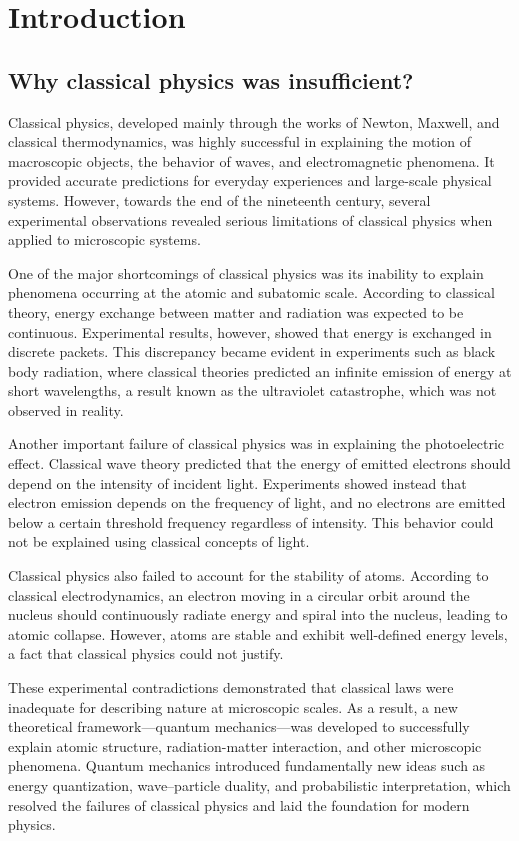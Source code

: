 \documentclass[17pt,a4paper]{extarticle}
\begin{document}
\section{Introduction}
\subsection{Why classical physics was insufficient?}

Classical physics, developed mainly through the works of Newton, Maxwell, and classical thermodynamics, was highly successful in explaining the motion of macroscopic objects, the behavior of waves, and electromagnetic phenomena. It provided accurate predictions for everyday experiences and large-scale physical systems. However, towards the end of the nineteenth century, several experimental observations revealed serious limitations of classical physics when applied to microscopic systems.

One of the major shortcomings of classical physics was its inability to explain phenomena occurring at the atomic and subatomic scale. According to classical theory, energy exchange between matter and radiation was expected to be continuous. Experimental results, however, showed that energy is exchanged in discrete packets. This discrepancy became evident in experiments such as black body radiation, where classical theories predicted an infinite emission of energy at short wavelengths, a result known as the ultraviolet catastrophe, which was not observed in reality.

Another important failure of classical physics was in explaining the photoelectric effect. Classical wave theory predicted that the energy of emitted electrons should depend on the intensity of incident light. Experiments showed instead that electron emission depends on the frequency of light, and no electrons are emitted below a certain threshold frequency regardless of intensity. This behavior could not be explained using classical concepts of light.

Classical physics also failed to account for the stability of atoms. According to classical electrodynamics, an electron moving in a circular orbit around the nucleus should continuously radiate energy and spiral into the nucleus, leading to atomic collapse. However, atoms are stable and exhibit well-defined energy levels, a fact that classical physics could not justify.

These experimental contradictions demonstrated that classical laws were inadequate for describing nature at microscopic scales. As a result, a new theoretical framework—quantum mechanics—was developed to successfully explain atomic structure, radiation-matter interaction, and other microscopic phenomena. Quantum mechanics introduced fundamentally new ideas such as energy quantization, wave–particle duality, and probabilistic interpretation, which resolved the failures of classical physics and laid the foundation for modern physics.
\end{document}
